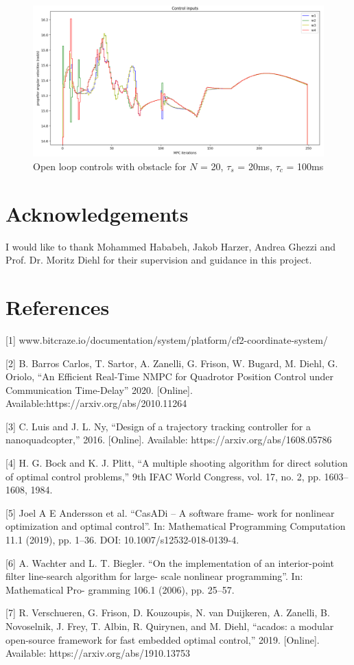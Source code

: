\documentclass[conference]{IEEEtran}
\begin{document}
\begin{figure}[htbp]
	\centerline{\includegraphics[scale = 0.45]{figures/Screenshot_OLwO_U.png} }
	\caption{Open loop controls with obstacle for $N$ = 20, $\tau_s$ = 20ms, $\tau_c$ = 100ms}
	\label{Fig6}
\end{figure}

\section{Acknowledgements}\label{Section7}
I would like to thank Mohammed Hababeh, Jakob Harzer, Andrea Ghezzi and Prof. Dr. Moritz Diehl for their supervision and guidance in this project.

\section{References}\label{Section8}
[1] www.bitcraze.io/documentation/system/platform/cf2-coordinate-system/

[2] B. Barros Carlos, T. Sartor, A. Zanelli, G. Frison, W. Bugard, M. Diehl, G. Oriolo, “An Efficient Real-Time NMPC for Quadrotor Position Control under Communication Time-Delay” 2020. [Online]. Available:https://arxiv.org/abs/2010.11264

[3] C. Luis and J. L. Ny, “Design of a trajectory tracking
controller for a nanoquadcopter,” 2016. [Online]. Available:
https://arxiv.org/abs/1608.05786

[4] H. G. Bock and K. J. Plitt, “A multiple shooting algorithm for direct
solution of optimal control problems,” 9th IFAC World Congress,
vol. 17, no. 2, pp. 1603–1608, 1984.

[5] Joel A E Andersson et al. “CasADi – A software frame-
work for nonlinear optimization and optimal control”. In:
Mathematical Programming Computation 11.1 (2019),
pp. 1–36. DOI: 10.1007/s12532-018-0139-4.

[6] A. Wachter and L. T. Biegler. “On the implementation
of an interior-point filter line-search algorithm for large-
scale nonlinear programming”. In: Mathematical Pro-
gramming 106.1 (2006), pp. 25–57.

[7] R. Verschueren, G. Frison, D. Kouzoupis, N. van Duijkeren, A. Zanelli, B. Novoselnik, J. Frey, T. Albin, R. Quirynen, and M. Diehl, “acados: a modular open-source framework for fast embedded optimal control,” 2019. [Online]. Available: https://arxiv.org/abs/1910.13753

\printbibliography
\end{document}
